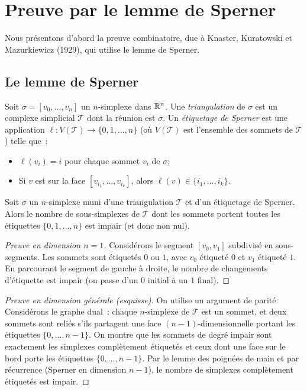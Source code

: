 \section{Preuve par le lemme de Sperner}

Nous pr\'esentons d'abord la preuve combinatoire, due \`a Knaster, Kuratowski et
Mazurkiewicz (1929), qui utilise le lemme de Sperner.

\subsection{Le lemme de Sperner}

\begin{definition}
Soit $\sigma = [v_0, \ldots, v_n]$ un $n$-simplexe dans $\mathbb{R}^n$. Une
\emph{triangulation} de $\sigma$ est un complexe simplicial $\mathcal{T}$ dont
la r\'eunion est $\sigma$. Un \emph{\'etiquetage de Sperner} est une application
$\ell : V(\mathcal{T}) \to \{0, 1, \ldots, n\}$ (o\`u $V(\mathcal{T})$ est
l'ensemble des sommets de $\mathcal{T}$) telle que~:
\begin{itemize}
    \item $\ell(v_i) = i$ pour chaque sommet $v_i$ de $\sigma$;
    \item Si $v$ est sur la face $[v_{i_1}, \ldots, v_{i_k}]$, alors
          $\ell(v) \in \{i_1, \ldots, i_k\}$.
\end{itemize}
\end{definition}

\begin{lemme}[Sperner, 1928]\label{lem:sperner}
Soit $\sigma$ un $n$-simplexe muni d'une triangulation $\mathcal{T}$ et d'un
\'etiquetage de Sperner. Alors le nombre de sous-simplexes de $\mathcal{T}$ dont
les sommets portent toutes les \'etiquettes $\{0, 1, \ldots, n\}$ est impair
(et donc non nul).
\end{lemme}

\begin{proof}[Preuve en dimension $n = 1$]
Consid\'erons le segment $[v_0, v_1]$ subdivis\'e en sous-segments. Les sommets
sont \'etiquet\'es $0$ ou $1$, avec $v_0$ \'etiquet\'e $0$ et $v_1$ \'etiquet\'e $1$.
En parcourant le segment de gauche \`a droite, le nombre de changements
d'\'etiquette est impair (on passe d'un $0$ initial \`a un $1$ final).
\end{proof}

\begin{proof}[Preuve en dimension g\'en\'erale (esquisse)]
On utilise un argument de parit\'e. Consid\'erons le graphe dual~: chaque
$n$-simplexe de $\mathcal{T}$ est un sommet, et deux sommets sont reli\'es s'ils
partagent une face $(n-1)$-dimensionnelle portant les \'etiquettes
$\{0, \ldots, n-1\}$. On montre que les sommets de degr\'e impair sont
exactement les simplexes compl\`etement \'etiquet\'es et ceux dont une face
sur le bord porte les \'etiquettes $\{0, \ldots, n-1\}$. Par le lemme des
poign\'ees de main et par r\'ecurrence (Sperner en dimension $n-1$), le nombre
de simplexes compl\`etement \'etiquet\'es est impair.
\end{proof}

